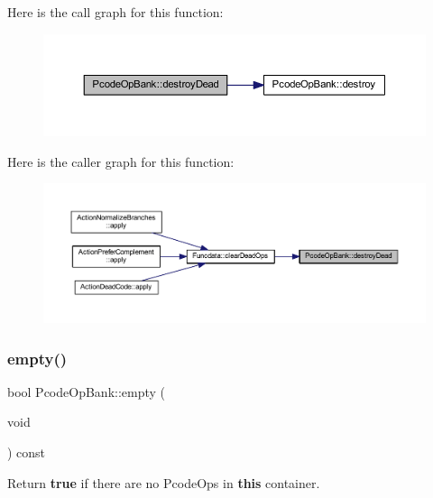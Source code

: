 Here is the call graph for this function\+:
\nopagebreak
\begin{figure}[H]
\begin{center}
\leavevmode
\includegraphics[width=350pt]{class_pcode_op_bank_aafab3087c0f8176d83088c66bc56f6b0_cgraph}
\end{center}
\end{figure}
Here is the caller graph for this function\+:
\nopagebreak
\begin{figure}[H]
\begin{center}
\leavevmode
\includegraphics[width=350pt]{class_pcode_op_bank_aafab3087c0f8176d83088c66bc56f6b0_icgraph}
\end{center}
\end{figure}
\mbox{\label{class_pcode_op_bank_aefe81f2a41de865f29c46270e8375236}} 
\subsubsection{\texorpdfstring{empty()}{empty()}}
{\footnotesize\ttfamily bool Pcode\+Op\+Bank\+::empty (\begin{DoxyParamCaption}\item[{void}]{ }\end{DoxyParamCaption}) const\hspace{0.3cm}{\ttfamily [inline]}}



Return {\bfseries{true}} if there are no Pcode\+Ops in {\bfseries{this}} container. 




